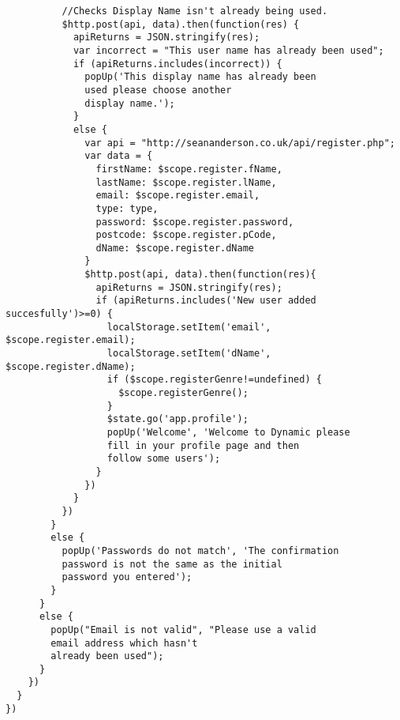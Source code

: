 \begin{verbatim}
          //Checks Display Name isn't already being used.
          $http.post(api, data).then(function(res) {
            apiReturns = JSON.stringify(res);
            var incorrect = "This user name has already been used";
            if (apiReturns.includes(incorrect)) {
              popUp('This display name has already been 
              used please choose another 
              display name.');
            }
            else {
              var api = "http://seananderson.co.uk/api/register.php";
              var data = {
                firstName: $scope.register.fName,
                lastName: $scope.register.lName,
                email: $scope.register.email,
                type: type,
                password: $scope.register.password,
                postcode: $scope.register.pCode,
                dName: $scope.register.dName
              }
              $http.post(api, data).then(function(res){
                apiReturns = JSON.stringify(res);
                if (apiReturns.includes('New user added succesfully')>=0) {
                  localStorage.setItem('email', $scope.register.email);
                  localStorage.setItem('dName', $scope.register.dName);
                  if ($scope.registerGenre!=undefined) {
                    $scope.registerGenre();
                  }
                  $state.go('app.profile');
                  popUp('Welcome', 'Welcome to Dynamic please 
                  fill in your profile page and then 
                  follow some users');
                }
              })
            }
          })
        }
        else {
          popUp('Passwords do not match', 'The confirmation 
          password is not the same as the initial 
          password you entered');
        }
      }
      else {
        popUp("Email is not valid", "Please use a valid 
        email address which hasn't 
        already been used");
      }
    })
  }
})
\end{verbatim}

